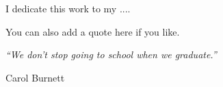 \documentclass[main.tex]{subfiles}
\begin{document}
\newpage

I dedicate this work to my ....

You can also add a quote here if you like.

\begin{flushleft}
\textit{``We don't stop going to school when we graduate.''}
\end{flushleft}

\begin{flushright}
Carol Burnett
\end{flushright}
\end{document}
